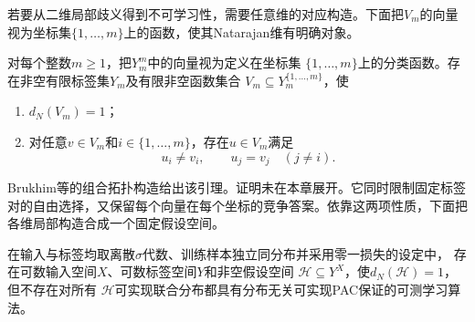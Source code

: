 若要从二维局部歧义得到不可学习性，需要任意维的对应构造。下面把$V_m$的向量视为坐标集$\{1,\ldots,m\}$上的函数，使其Natarajan维有明确对象。

\begin{lemma}[低Natarajan维的局部邻接构造]
\label{lem:low-natarajan-pseudocubes}
对每个整数$m\geq1$，把$Y_m^m$中的向量视为定义在坐标集
$\{1,\ldots,m\}$上的分类函数。存在非空有限标签集$Y_m$及有限非空函数集合
$V_m\subseteq Y_m^{\{1,\ldots,m\}}$，使
\begin{enumerate}
 \item $d_N(V_m)=1$；
 \item 对任意$v\in V_m$和$i\in\{1,\ldots,m\}$，存在$u\in V_m$满足
 \[
 u_i\neq v_i,\qquad u_j=v_j\quad(j\neq i).
 \]
\end{enumerate}
\end{lemma}

Brukhim等的组合拓扑构造给出该引理。证明未在本章展开。它同时限制固定标签对的自由选择，又保留每个向量在每个坐标的竞争答案。依靠这两项性质，下面把各维局部构造合成一个固定假设空间。

\begin{theorem}[无限标签下有限Natarajan维并不充分]
\label{thm:natarajan-infinite-counterexample}
在输入与标签均取离散$\sigma$代数、训练样本独立同分布并采用零一损失的设定中，
存在可数输入空间$X$、可数标签空间$Y$和非空假设空间
$\mathcal H\subseteq Y^X$，使$d_N(\mathcal H)=1$，但不存在对所有
$\mathcal H$可实现联合分布都具有分布无关可实现PAC保证的可测学习算法。
\end{theorem}


